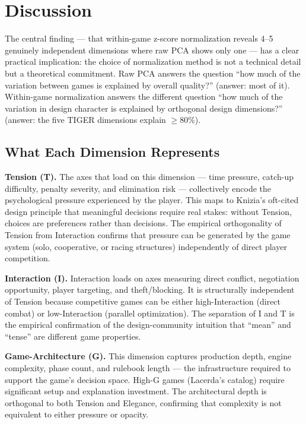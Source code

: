 \section{Discussion}
\label{sec:discussion}

The central finding --- that within-game z-score normalization reveals 4--5 genuinely
independent dimensions where raw PCA shows only one --- has a clear practical implication:
the choice of normalization method is not a technical detail but a theoretical commitment.
Raw PCA answers the question ``how much of the variation between games is explained by
overall quality?'' (answer: most of it). Within-game normalization answers the different
question ``how much of the variation in design character is explained by orthogonal
design dimensions?'' (answer: the five TIGER dimensions explain $\geq 80\%$).

\subsection{What Each Dimension Represents}

\textbf{Tension (T).} The axes that load on this dimension --- time pressure, catch-up
difficulty, penalty severity, and elimination risk --- collectively encode the psychological
pressure experienced by the player. This maps to Knizia's oft-cited design principle that
meaningful decisions require real stakes: without Tension, choices are preferences rather
than decisions. The empirical orthogonality of Tension from Interaction confirms that
pressure can be generated by the game system (solo, cooperative, or racing structures)
independently of direct player competition.

\textbf{Interaction (I).} Interaction loads on axes measuring direct conflict, negotiation
opportunity, player targeting, and theft/blocking. It is structurally independent of
Tension because competitive games can be either high-Interaction (direct combat) or
low-Interaction (parallel optimization). The separation of I and T is the empirical
confirmation of the design-community intuition that ``mean'' and ``tense'' are different
game properties.

\textbf{Game-Architecture (G).} This dimension captures production depth, engine
complexity, phase count, and rulebook length --- the infrastructure required to
support the game's decision space. High-G games (Lacerda's catalog) require significant
setup and explanation investment. The architectural depth is orthogonal to both Tension
and Elegance, confirming that complexity is not equivalent to either pressure or opacity.

